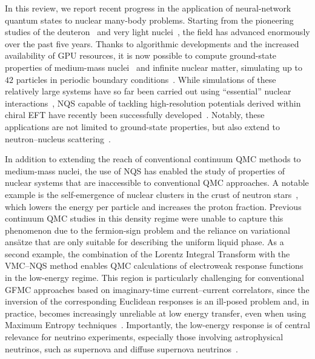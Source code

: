 In this review, we report recent progress in the application of neural-network quantum states to nuclear many-body problems. Starting from the pioneering studies of the deuteron~\cite{keeble_machine_2020} and very light nuclei~\cite{adams_variational_2021}, the field has advanced enormously over the past five years. Thanks to algorithmic developments and the increased availability of GPU resources, it is now possible to compute ground-state properties of medium-mass nuclei~\cite{gnech_distilling_2024} and infinite nuclear matter, simulating up to $42$ particles in periodic boundary conditions~\cite{fore_investigating_2024}. While simulations of these relatively large systems have so far been carried out using ``essential'' nuclear interactions~\cite{schiavilla_two-_2021}, NQS capable of tackling high-resolution potentials derived within chiral EFT have recently been successfully developed~\cite{wen_neural-network_2025,yang_zemach_2025}. Notably, these applications are not limited to ground-state properties, but also extend to neutron–nucleus scattering~\cite{yang_chiral_2025}.

In addition to extending the reach of conventional continuum QMC methods to medium-mass nuclei, the use of NQS has enabled the study of properties of nuclear systems that are inaccessible to conventional QMC approaches. A notable example is the self-emergence of nuclear clusters in the crust of neutron stars~\cite{fore_investigating_2024}, which lowers the energy per particle and increases the proton fraction. Previous continuum QMC studies in this density regime were unable to capture this phenomenon due to the fermion-sign problem and the reliance on variational ans\"atze that are only suitable for describing the uniform liquid phase. As a second example, the combination of the Lorentz Integral Transform with the VMC--NQS method enables QMC calculations of electroweak response functions~\cite{parnes_nuclear_2026} in the low-energy regime. This region is particularly challenging for conventional GFMC approaches based on imaginary-time current--current correlators, since the inversion of the corresponding Euclidean responses is an ill-posed problem and, in practice, becomes increasingly unreliable at low energy transfer, even when using Maximum Entropy techniques~\cite{lovato_electromagnetic_2016}. Importantly, the low-energy response is of central relevance for neutrino experiments, especially those involving astrophysical neutrinos, such as supernova and diffuse supernova neutrinos~\cite{scholberg_supernova_2012}.

